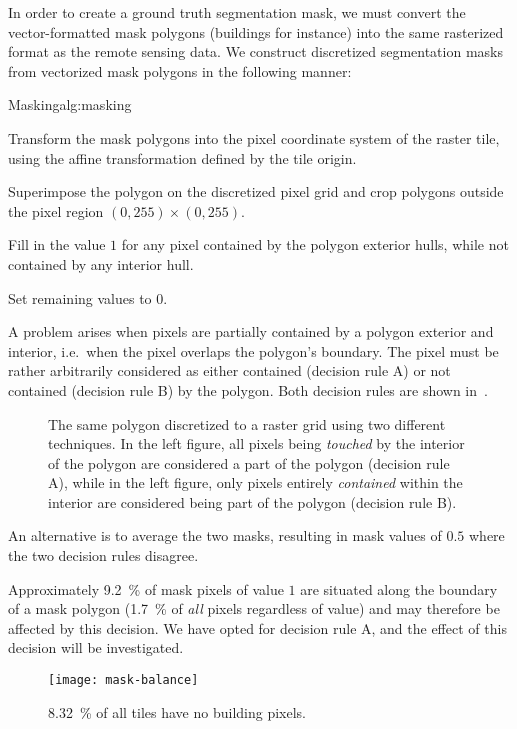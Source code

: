 In order to create a ground truth segmentation mask, we must convert the vector-formatted mask polygons (buildings for instance) into the same rasterized format as the remote sensing data.
We construct discretized segmentation masks from vectorized mask polygons in the following manner:

\begin{algorithm}{Masking}{alg:masking}
  \item Transform the mask polygons into the pixel coordinate system of the raster tile, using the affine transformation defined by the tile origin.
  \item Superimpose the polygon on the discretized pixel grid and crop polygons outside the pixel region $(0, 255) \times (0, 255)$.
  \item Fill in the value $1$ for any pixel contained by the polygon exterior hulls, while not contained by any interior hull.
  \item Set remaining values to $0$.
\end{algorithm}

A problem arises when pixels are partially contained by a polygon exterior and interior, i.e.\ when the pixel overlaps the polygon's boundary.
The pixel must be rather arbitrarily considered as either contained (decision rule A) or not contained (decision rule B) by the polygon.
Both decision rules are shown in~.

\begin{figure}[H]
  \centering
  
  \hspace{2em}
  
  \caption{%
    The same polygon discretized to a raster grid using two different techniques.
    In the left figure, all pixels being \textit{touched} by the interior of the polygon
    are considered a part of the polygon (decision rule A), while in the left figure, only pixels
    entirely \textit{contained} within the interior are considered being part
    of the polygon (decision rule B).
  }%
  \label{fig:pixel-containment}
\end{figure}

An alternative is to average the two masks, resulting in mask values of $0.5$ where the two decision rules disagree.

Approximately \SI{9.2}{\percent} of mask pixels of value $1$ are situated along the boundary of a mask polygon (\SI{1.7}{\percent} of \textit{all} pixels regardless of value) and may therefore be affected by this decision.
We have opted for decision rule A, and the effect of this decision will be investigated.

\begin{figure}[H]
  \centering
  \texttt{[image: mask-balance]}
  \caption{%
    \SI{8.32}{\percent} of all tiles have no building pixels.
  }
\end{figure}
